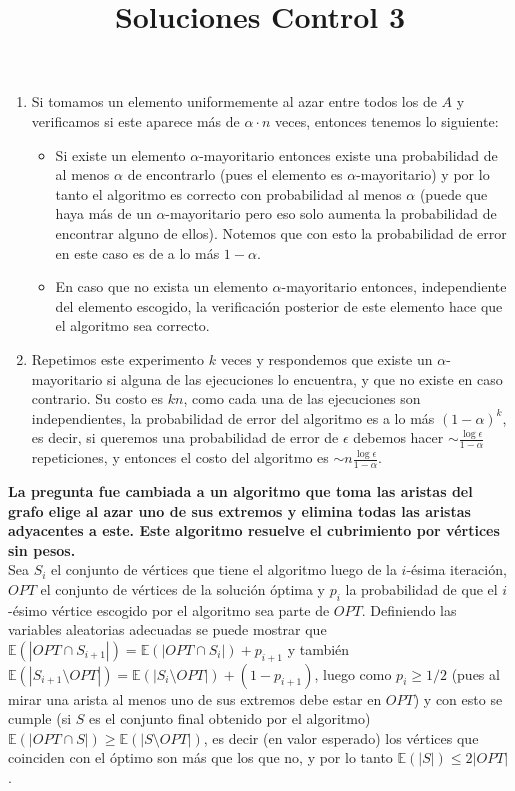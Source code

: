 \documentclass[dcc,uchile]{fcfmcourse}
\title{Soluciones Control 3}
\theoremstyle{plain}
\theoremstyle{definition}
\begin{document}
\maketitle


\vspace{-1ex}


\begin{problems}
\problem 
\begin{enumerate}[1.]
    \item Si tomamos un elemento uniformemente al azar entre todos los de $A$ y verificamos si este aparece más de $\alpha\cdot n$ veces, entonces tenemos lo siguiente:
    \begin{itemize}
        \item Si existe un elemento $\alpha$-mayoritario entonces existe una probabilidad de al menos $\alpha$ de encontrarlo (pues el elemento es $\alpha$-mayoritario) y por lo tanto el algoritmo es correcto con probabilidad al menos $\alpha$ (puede que haya más de un $\alpha$-mayoritario pero eso solo aumenta la probabilidad de encontrar alguno de ellos). Notemos que con esto la probabilidad de error en este caso es de a lo más $1-\alpha$.
        \item En caso que no exista un elemento $\alpha$-mayoritario entonces, independiente del elemento escogido, la verificación posterior de este elemento hace que el algoritmo sea correcto.
    \end{itemize}
    \item Repetimos este experimento $k$ veces y respondemos que existe un $\alpha$-mayoritario si alguna de las ejecuciones lo encuentra, y que no existe en caso contrario. Su costo es $kn$, como cada una de las ejecuciones son independientes, la probabilidad de error del algoritmo es a lo más $(1-\alpha)^{k}$, es decir, si queremos una probabilidad de error de $\epsilon$ debemos hacer $\sim \frac{\log{\epsilon}}{1-\alpha}$ repeticiones, y entonces el costo del algoritmo es $\sim n \frac{\log{\epsilon}}{1-\alpha}$.
\end{enumerate}
\problem \textbf{La pregunta fue cambiada a un algoritmo que toma las aristas del grafo elige al azar uno de sus extremos y elimina todas las aristas adyacentes a este. Este algoritmo resuelve el cubrimiento por vértices sin pesos.}\\
Sea $S_{i}$ el conjunto de vértices que tiene el algoritmo luego de la $i$-ésima iteración,$OPT$ el conjunto de vértices de la solución óptima y  $p_{i}$ la probabilidad de que el $i$-ésimo vértice escogido por el algoritmo sea parte de $OPT$. Definiendo las variables aleatorias adecuadas se puede mostrar que $\mathbb{E}(|OPT \cap S_{i+1}|) = \mathbb{E}(|OPT \cap S_{i}|) + p_{i+1}$ y también $\mathbb{E}(|S_{i+1}\setminus OPT|) = \mathbb{E}(|S_{i}\setminus OPT|) + (1-p_{i+1})$, luego como $p_{i}\ge 1/2$ (pues al mirar una arista al menos uno de sus extremos debe estar en $OPT$) y con esto se cumple (si $S$ es el conjunto final obtenido por el algoritmo) $\mathbb{E}(|OPT \cap S|) \ge \mathbb{E}(|S\setminus OPT|)$, es decir (en valor esperado) los vértices que coinciden con el óptimo son más que los que no, y por lo tanto $\mathbb{E}(|S|)\le 2|OPT|$.

\end{problems}
\end{document}
